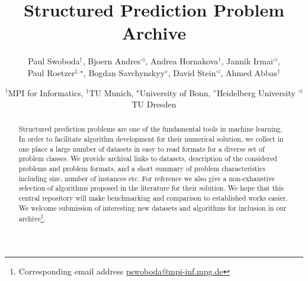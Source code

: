 \documentclass[twocolumn]{article}
\title{Structured Prediction Problem Archive}
\author{Paul Swoboda$^\dagger$, Bjoern Andres$^{\triangleleft}$, Andrea Hornakova$^\dagger$, Jannik Irmai$^\triangleleft$, \\ Paul Roetzer$^{\ddagger,\star}$, Bogdan Savchynskyy$^{\diamond}$, David Stein$^\triangleleft$, Ahmed Abbas$^\dagger$}
\date{%
$^\dagger$MPI for Informatics, %
$^\ddagger$TU Munich, %
$^\star$University of Bonn, %
$^\diamond$Heidelberg University %
$^\triangleleft$TU Dresden %
}
\begin{document}
\maketitle

\begin{abstract}
Structured prediction problems are one of the fundamental tools in machine learning.
In order to facilitate algorithm development for their numerical solution, we collect in one place a large number of datasets in easy to read formats for a diverse set of problem classes.
We provide archival links to datasets, description of the considered problems and problem formats, and a short summary of problem characteristics including size, number of instances etc.
For reference we also give a non-exhaustive selection of algorithms proposed in the literature for their solution.
We hope that this central repository will make benchmarking and comparison to established works easier.
    We welcome submission of interesting new datasets and algorithms for inclusion in our archive\footnote{Corresponding email address \href{mailto:pswoboda@mpi-inf.mpg.de}{pswoboda@mpi-inf.mpg.de}}.
\end{abstract}

\tableofcontents

\clearpage



\clearpage

\clearpage

%
\clearpage

\clearpage

\clearpage

\clearpage

\clearpage

\clearpage

\clearpage

\clearpage

\clearpage

\clearpage


{\small


} 

\end{document}
